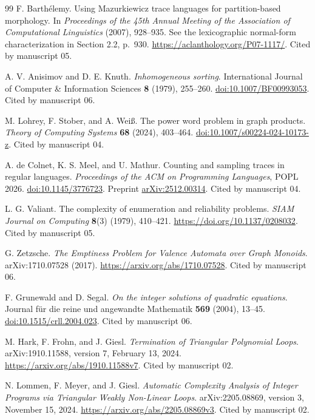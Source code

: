 \documentclass[11pt,a4paper]{article}
\theoremstyle{definition}
\theoremstyle{remark}
\begin{document}
\begin{thebibliography}{99}
F. Barth\'elemy.
Using Mazurkiewicz trace languages for partition-based morphology.
In \emph{Proceedings of the 45th Annual Meeting of the Association of Computational Linguistics} (2007), 928--935.
See the lexicographic normal-form characterization in Section 2.2, p.~930.
\url{https://aclanthology.org/P07-1117/}.
Cited by manuscript 05.

A. V. Anisimov and D. E. Knuth.
\emph{Inhomogeneous sorting}.
International Journal of Computer \& Information Sciences \textbf{8} (1979), 255--260.
\href{https://doi.org/10.1007/BF00993053}{doi:10.1007/BF00993053}.
Cited by manuscript 06.

M. Lohrey, F. Stober, and A. Wei\ss.
The power word problem in graph products.
\emph{Theory of Computing Systems} \textbf{68} (2024), 403--464.
\href{https://doi.org/10.1007/s00224-024-10173-z}{doi:10.1007/s00224-024-10173-z}.
Cited by manuscript 04.

A. de Colnet, K. S. Meel, and U. Mathur.
Counting and sampling traces in regular languages.
\emph{Proceedings of the ACM on Programming Languages}, POPL 2026.
\href{https://doi.org/10.1145/3776723}{doi:10.1145/3776723}.
Preprint \href{https://arxiv.org/abs/2512.00314}{arXiv:2512.00314}.
Cited by manuscript 04.

L. G. Valiant.
The complexity of enumeration and reliability problems.
\emph{SIAM Journal on Computing} \textbf{8}(3) (1979), 410--421.
\url{https://doi.org/10.1137/0208032}.
Cited by manuscript 05.

G. Zetzsche.
\emph{The Emptiness Problem for Valence Automata over Graph Monoids}.
arXiv:1710.07528 (2017).
\url{https://arxiv.org/abs/1710.07528}.
Cited by manuscript 06.

F. Grunewald and D. Segal.
\emph{On the integer solutions of quadratic equations}.
Journal f\"ur die reine und angewandte Mathematik \textbf{569} (2004), 13--45.
\href{https://doi.org/10.1515/crll.2004.023}{doi:10.1515/crll.2004.023}.
Cited by manuscript 06.

M. Hark, F. Frohn, and J. Giesl.
\emph{Termination of Triangular Polynomial Loops}.
arXiv:1910.11588, version 7, February 13, 2024.
\url{https://arxiv.org/abs/1910.11588v7}.
Cited by manuscript 02.

N. Lommen, F. Meyer, and J. Giesl.
\emph{Automatic Complexity Analysis of Integer Programs via Triangular Weakly Non-Linear Loops}.
arXiv:2205.08869, version 3, November 15, 2024.
\url{https://arxiv.org/abs/2205.08869v3}.
Cited by manuscript 02.


\end{thebibliography}
\end{document}
